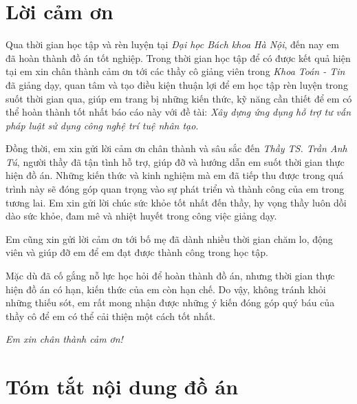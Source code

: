{\centering \section*{Lời cảm ơn}}

Qua thời gian học tập và rèn luyện tại
\textit{Đại học Bách khoa Hà Nội},
đến nay em đã hoàn thành đồ án tốt nghiệp.
Trong thời gian học tập để có được kết quả hiện tại
em xin chân thành cảm ơn tới các thầy cô giảng viên trong \textit{Khoa Toán - Tin}
đã giảng dạy, quan tâm và tạo điều kiện thuận lợi để em học tập rèn luyện trong suốt thời gian qua,
giúp em trang bị những kiến thức, kỹ năng cần thiết
để em có thể hoàn thành tốt nhất báo cáo này
với
đề tài:
\textit{Xây dựng ứng dụng hỗ trợ tư vấn pháp luật sử dụng công nghệ trí tuệ nhân tạo}.

Đồng thời, em xin gửi lời cảm ơn chân thành và sâu sắc đến \textit{Thầy TS. Trần Anh Tú},
người thầy đã tận tình hỗ trợ,
giúp đỡ và hướng dẫn em suốt thời gian thực hiện đồ án.
Những kiến thức và kinh nghiệm mà em đã tiếp thu được trong quá trình này
sẽ đóng góp quan trọng vào sự phát triển và thành công của em trong tương lai.
Em xin gửi lời chúc sức khỏe tốt nhất đến thầy,
hy vọng thầy luôn dồi dào sức khỏe, đam mê và nhiệt huyết trong công việc giảng dạy.

Em cũng xin gửi lời cảm ơn tới bố mẹ
đã dành nhiều thời gian chăm lo, động viên
và giúp đỡ em để em đạt được thành công trong học tập.

Mặc dù đã cố gắng nỗ lực học hỏi để hoàn thành đồ án,
nhưng thời gian thực hiện đồ án có hạn,
kiến thức của em còn hạn chế.
Do vậy,
không tránh khỏi những thiếu sót,
em rất mong nhận được những ý kiến đóng góp quý báu của thầy cô
để em có thể cải thiện một cách tốt nhất.

\vspace{0.5cm} \emph{Em xin chân thành cảm ơn!}


{\centering \section*{Tóm tắt nội dung đồ án}}



